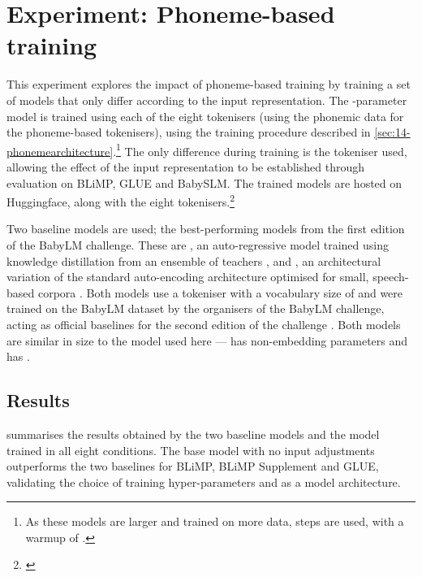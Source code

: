 \section{Experiment: Phoneme-based training}\label{sec:14-phonemepretraining}

This experiment explores the impact of phoneme-based training by training a set of models that only differ according to the input representation. The -parameter \gpt model is trained using each of the eight tokenisers (using the phonemic data for the phoneme-based tokenisers), using the training procedure described in \cref{sec:14-phonemearchitecture}.\footnote{As these models are larger and trained on more data,  steps are used, with a warmup of .} The only difference during training is the tokeniser used, allowing the effect of the input representation to be established through evaluation on BLiMP, GLUE and BabySLM. The trained models are hosted on Huggingface, along with the eight tokenisers.\footnote{\href{https://huggingface.co/collections/phonemetransformers/from-babble-to-words-66e068b54765a48ff30273c9}{}}

Two baseline models are used; the best-performing models from the first edition of the BabyLM challenge. These are , an auto-regressive model trained using knowledge distillation from an ensemble of teachers \citep{timiryasov-tastet-2023-baby}, and , an architectural variation of the standard auto-encoding \bert architecture optimised for small, speech-based corpora \citep{samuel-etal-2023-trained, charpentier-samuel-2023-layers}. Both models use a \bpe tokeniser with a vocabulary size of  and were trained on the BabyLM dataset by the organisers of the BabyLM challenge, acting as official baselines for the second edition of the challenge \citep{hu-etal-2024-findings}. Both models are similar in size to the \gpt model used here ---  has  non-embedding parameters and  has .

\subsection{Results}

 summarises the results obtained by the two baseline models and the \gpt model trained in all eight conditions. %
The base \gpt model with no input adjustments outperforms the two baselines for BLiMP, BLiMP Supplement and GLUE, validating the choice of training hyper-parameters and \gpt as a model architecture.

